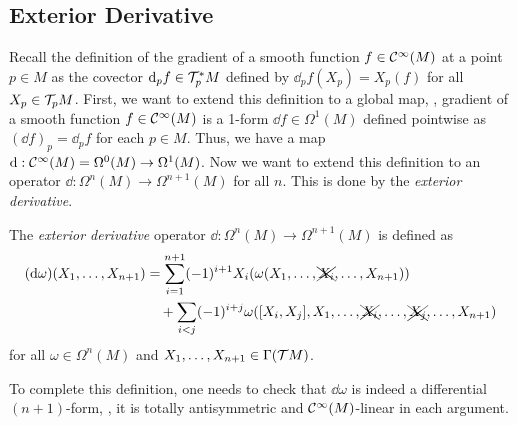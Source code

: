 \subsection{Exterior Derivative}

Recall the definition of the gradient of a smooth function \(f \in \mathcal C^\infty(M)\) at a point \(p \in M\) as the covector \(\dd_p f \in \mathcal T^*_p M\) defined by \(\dd_p f(X_p) = X_p(f)\) for all \(X_p \in \mathcal T_p M\). First, we want to extend this definition to a global map, \ie, gradient of a smooth function \(f \in \mathcal C^\infty(M)\) is a 1-form \(\dd f \in \Omega^1(M)\) defined pointwise as \((\dd f)_p = \dd_p f\) for each \(p \in M\). Thus, we have a map \(\dd: \mathcal C^\infty(M) = \Omega^0(M) \to \Omega^1(M)\). Now we want to extend this definition to an operator \(\dd: \Omega^n(M) \to \Omega^{n+1}(M)\) for all \(n\). This is done by the \emph{exterior derivative}.
\begin{definition}
    The \emph{exterior derivative} operator \(\dd: \Omega^n(M) \to \Omega^{n+1}(M)\) is defined as
    \begin{align*}
        (\dd \omega)(X_1, \ldots, X_{n+1}) & = \sum_{i=1}^{n+1} (-1)^{i+1} X_i(\omega(X_1, \ldots, \xcancel{X_i}, \ldots, X_{n+1}))                                 \\
                                           & \quad + \sum_{i < j} (-1)^{i+j} \omega([X_i, X_j], X_1, \ldots, \xcancel{X_i}, \ldots, \xcancel{X_j}, \ldots, X_{n+1})
    \end{align*}
    for all \(\omega \in \Omega^n(M)\) and \(X_1, \ldots, X_{n+1} \in \Gamma(\mathcal T M)\).
\end{definition}
To complete this definition, one needs to check that \(\dd \omega\) is indeed a differential \((n+1)\)-form, \ie, it is totally antisymmetric and \(\mathcal C^\infty(M)\)-linear in each argument.

